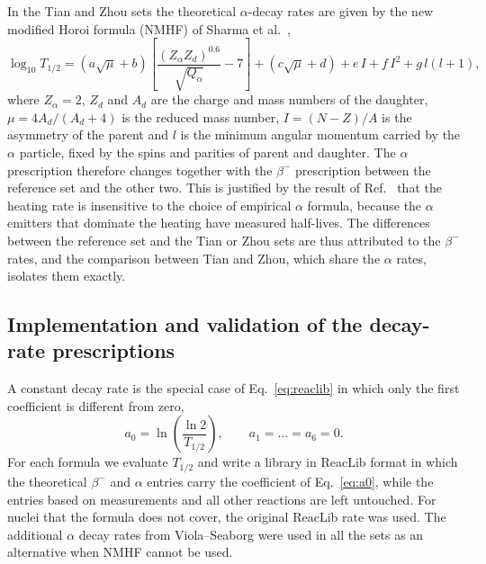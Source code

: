 In the Tian and Zhou sets the theoretical $\alpha$-decay rates are given by the new modified Horoi formula (NMHF) of Sharma et al.~\cite{sharma_new_2021},
\begin{equation}\label{eq:nmhf}
  \log_{10}T_{1/2}=\left(a\sqrt{\mu}+b\right)\left[\frac{(Z_\alpha Z_d)^{0.6}}{\sqrt{Q_\alpha}}-7\right]+\left(c\sqrt{\mu}+d\right)+e\,I+f\,I^2+g\,l(l+1),
\end{equation}
where $Z_\alpha=2$, $Z_d$ and $A_d$ are the charge and mass numbers of the daughter, $\mu=4A_d/(A_d+4)$ is the reduced mass number, $I=(N-Z)/A$ is the asymmetry of the parent and $l$ is the minimum angular momentum carried by the $\alpha$ particle, fixed by the spins and parities of parent and daughter.
The $\alpha$ prescription therefore changes together with the $\beta^-$ prescription between the reference set and the other two.
This is justified by the result of Ref.~\cite{hernandez_porras_features_2027} that the heating rate is insensitive to the choice of empirical $\alpha$ formula, because the $\alpha$ emitters that dominate the heating have measured half-lives.
The differences between the reference set and the Tian or Zhou sets are thus attributed to the $\beta^-$ rates, and the comparison between Tian and Zhou, which share the $\alpha$ rates, isolates them exactly.

\subsection{Implementation and validation of the decay-rate prescriptions}
A constant decay rate is the special case of Eq.~\ref{eq:reaclib} in which only the first coefficient is different from zero,
\begin{equation}\label{eq:a0}
  a_0=\ln\left(\frac{\ln2}{T_{1/2}}\right),\qquad a_1=\dots=a_6=0 .
\end{equation}
For each formula we evaluate $T_{1/2}$ and write a library in ReacLib format in which the theoretical $\beta^-$ and $\alpha$ entries carry the coefficient of Eq.~\ref{eq:a0}, while the entries based on measurements and all other reactions are left untouched.
For nuclei that the formula does not cover, the original ReacLib rate was used.
The additional $\alpha$ decay rates from Viola--Seaborg were used in all the sets as an alternative when NMHF cannot be used.

